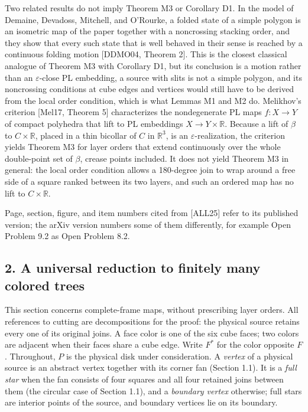 \documentclass[
  11pt,
]{article}
\begin{document}
Two related results do not imply Theorem M3 or Corollary D1. In the
model of Demaine, Devadoss, Mitchell, and O'Rourke, a folded state of a
simple polygon is an isometric map of the paper together with a
noncrossing stacking order, and they show that every such state that is
well behaved in their sense is reached by a continuous folding motion
{[}DDMO04, Theorem 2{]}. This is the closest classical analogue of
Theorem M3 with Corollary D1, but its conclusion is a motion rather than
an \(\varepsilon\)-close PL embedding, a source with slits is not a
simple polygon, and its noncrossing conditions at cube edges and
vertices would still have to be derived from the local order condition,
which is what Lemmas M1 and M2 do. Melikhov's criterion {[}Mel17,
Theorem 5{]} characterizes the nondegenerate PL maps \(f:X\to Y\) of
compact polyhedra that lift to PL embeddings \(X\to Y\times\mathbb R\).
Because a lift of \(\beta\) to \(C\times\mathbb R\), placed in a thin
bicollar of \(C\) in \(\mathbb R^3\), is an \(\varepsilon\)-realization,
the criterion yields Theorem M3 for layer orders that extend
continuously over the whole double-point set of \(\beta\), crease points
included. It does not yield Theorem M3 in general: the local order
condition allows a 180-degree join to wrap around a free side of a
square ranked between its two layers, and such an ordered map has no
lift to \(C\times\mathbb R\).

Page, section, figure, and item numbers cited from {[}ALL25{]} refer to
its published version; the arXiv version numbers some of them
differently, for example Open Problem 9.2 as Open Problem 8.2.

\subsection{2. A universal reduction to finitely many colored
trees}\label{a-universal-reduction-to-finitely-many-colored-trees}

This section concerns complete-frame maps, without prescribing layer
orders. All references to cutting are decompositions for the proof: the
physical source retains every one of its original joins. A face color is
one of the six cube faces; two colors are adjacent when their faces
share a cube edge. Write \(F^*\) for the color opposite \(F\).
Throughout, \(P\) is the physical disk under consideration. A
\emph{vertex} of a physical source is an abstract vertex together with
its corner fan (Section 1.1). It is a \emph{full star} when the fan
consists of four squares and all four retained joins between them (the
circular case of Section 1.1), and a \emph{boundary vertex} otherwise;
full stars are interior points of the source, and boundary vertices lie
on its boundary.
\end{document}
